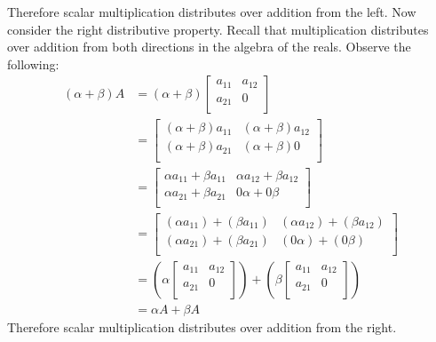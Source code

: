 \documentclass{article}
\begin{document}
Therefore scalar multiplication distributes over addition from the left.
\newpage
Now consider the right distributive property. Recall that multiplication distributes over addition from both directions in the algebra of the reals. Observe the following:
\begin{align*}
  \left( \alpha +\beta  \right)A&=\left( \alpha +\beta  \right)  \begin{bmatrix}
    a_{11}  &a_{12}    \\
     a_{21} &0    \\
  \end{bmatrix}\\
  &=\begin{bmatrix}
    \left( \alpha +\beta  \right)a_{11}  &\left( \alpha +\beta  \right)a_{12}    \\
    \left( \alpha +\beta  \right)a_{21} &\left( \alpha +\beta  \right)0    \\
  \end{bmatrix}\\
  &=\begin{bmatrix}
    \alpha a_{11}  +\beta a_{11}   &\alpha a_{12}+\beta a_{12}     \\
     \alpha a_{21}+\beta a_{21}  &0\alpha +0\beta    \\
  \end{bmatrix}\\
  &=\begin{bmatrix}
    (\alpha a_{11})  +(\beta a_{11})   &(\alpha a_{12})+(\beta a_{12})     \\
     (\alpha a_{21})+(\beta a_{21})  &(0\alpha) +(0\beta)    \\
  \end{bmatrix}\\
  &=\left( \alpha \begin{bmatrix}
    a_{11}  &a_{12}    \\
     a_{21} &0    \\
  \end{bmatrix} \right) +\left( \beta \begin{bmatrix}
    a_{11}  &a_{12}    \\
     a_{21} &0    \\
  \end{bmatrix} \right) \\
  &=\alpha A+\beta A
\end{align*}
Therefore scalar multiplication distributes over addition from the right.
\end{document}
